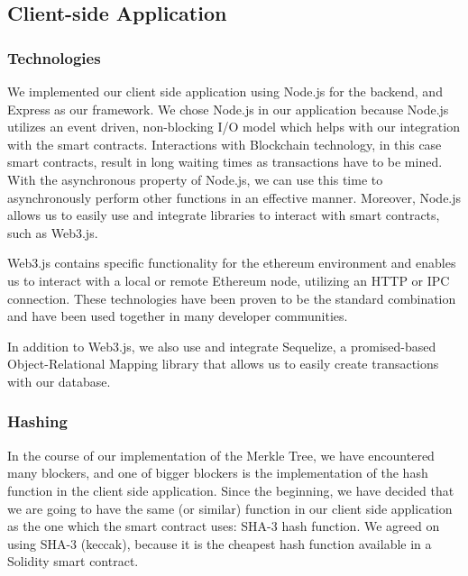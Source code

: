 \subsection{Client-side Application}
\label{subsec:approach-implementation-client}

\subsubsection*{Technologies}

We implemented our client side application using Node.js for the backend, and Express as our framework. We chose Node.js in our application because Node.js utilizes an event driven, non-blocking I/O model which helps with our integration with the smart contracts. Interactions with Blockchain technology, in this case smart contracts, result in long waiting times as transactions have to be mined. With the asynchronous property of Node.js, we can use this time to asynchronously perform other functions in an effective manner. Moreover, Node.js allows us to easily use and integrate libraries to interact with smart contracts, such as Web3.js.

Web3.js contains specific functionality for the ethereum environment and enables us to interact with a local or remote Ethereum node, utilizing an HTTP or IPC connection. These technologies have been proven to be the standard combination and have been used together in many developer communities. 

In addition to Web3.js, we also use and integrate Sequelize, a promised-based Object-Relational Mapping library that allows us to easily create transactions with our database.

\subsubsection*{Hashing}

In the course of our implementation of the Merkle Tree, we have encountered many blockers, and one of bigger blockers is the implementation of the hash function in the client side application. Since the beginning, we have decided that we are going to have the same (or similar) function in our client side application as the one which the smart contract uses: SHA-3 hash function. We agreed on using SHA-3 (keccak), because it is the cheapest hash function available in a Solidity smart contract. 

